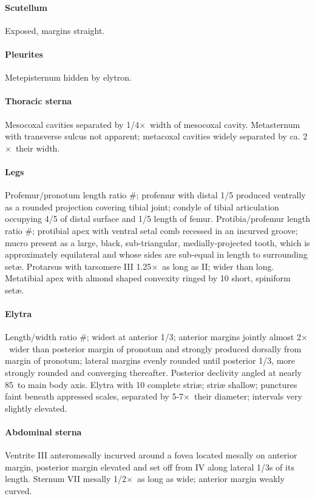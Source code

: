\documentclass[fleqn,10pt,lineno]{wlpeerj} %
\newcommand{\td}{\textdegree~}
\newcommand{\x}{$\times$~}
\begin{document}
			\paragraph{Scutellum}
				Exposed, margins straight.
			\paragraph{Pleurites}
				Metepisternum hidden by elytron.
			\paragraph{Thoracic sterna}
				Mesocoxal cavities separated by 1/4\x width of mesocoxal cavity. 
				Metasternum with transverse sulcus not apparent; metacoxal cavities widely separated by ca. 2\x their width.
			\paragraph{Legs}
				Profemur/pronotum length ratio \#; profemur with distal 1/5 produced ventrally as a rounded projection covering tibial joint; condyle of tibial articulation occupying 4/5 of distal surface and 1/5 length of femur. 
				Protibia/profemur length ratio \#; protibial apex with ventral setal comb recessed in an incurved groove; mucro present as a large, black, sub-triangular, medially-projected tooth, which is approximately equilateral and whose sides are sub-equal in length to surrounding set{\ae}. 
				Protarsus with tarsomere III 1.25\x as long as II; wider than long. 
				Metatibial apex with almond shaped convexity ringed by 10 short, spiniform set{\ae}.
			\paragraph{Elytra}
				Length/width ratio \#; widest at anterior 1/3; anterior margins jointly almost 2\x wider than posterior margin of pronotum and strongly produced dorsally from margin of pronotum; lateral margins evenly rounded until posterior 1/3, more strongly rounded and converging thereafter. 
				Posterior declivity angled at nearly 85\td to main body axis. Elytra with 10 complete stri{\ae}; stri{\ae} shallow; punctures faint beneath appressed scales, separated by 5-7\x their diameter; intervals very slightly elevated.
			\paragraph{Abdominal sterna}
				Ventrite III anteromesally incurved around a fovea located mesally on anterior margin, posterior margin elevated and set off from IV along lateral 1/3s of its length. 
				Sternum VII mesally 1/2\x as long as wide; anterior margin weakly curved.
\end{document}
